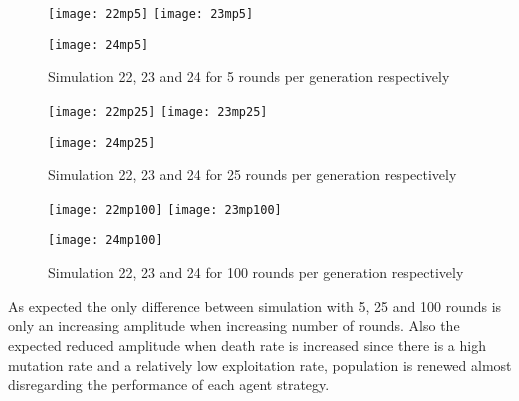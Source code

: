 \documentclass{book}
\begin{document}
\begin{figure}[H]       
    \begin{center}
    \mbox{\texttt{[image: 22mp5]}}   
    \hspace{0px}
    \mbox{\texttt{[image: 23mp5]}}
    \hspace{40px}
    \end{center}
    \begin{center}
    \mbox{\texttt{[image: 24mp5]}}
    \end{center}
    \caption{Simulation 22, 23 and 24 for 5 rounds per generation respectively}
    \label{simulation222324mp5}
\end{figure}

\begin{figure}[H]       
    \begin{center}
    \mbox{\texttt{[image: 22mp25]}}   
    \hspace{0px}
    \mbox{\texttt{[image: 23mp25]}}
    \hspace{40px}
    \end{center}
    \begin{center}
    \mbox{\texttt{[image: 24mp25]}}
    \end{center}
    \caption{Simulation 22, 23 and 24 for 25 rounds per generation respectively}
    \label{simulation222324mp25}
\end{figure}

\begin{figure}[H]       
    \begin{center}
    \mbox{\texttt{[image: 22mp100]}}   
    \hspace{0px}
    \mbox{\texttt{[image: 23mp100]}}
    \hspace{40px}
    \end{center}
    \begin{center}
    \mbox{\texttt{[image: 24mp100]}}
    \end{center}
    \caption{Simulation 22, 23 and 24 for 100 rounds per generation respectively}
    \label{simulation222324mp100}
\end{figure}

As expected the only difference between simulation with 5, 25 and 100 rounds is only an increasing amplitude when increasing number of rounds. Also the expected reduced amplitude when death rate is increased since there is a high mutation rate and a relatively low exploitation rate, population is renewed almost disregarding the performance of each agent strategy.
\end{document}
